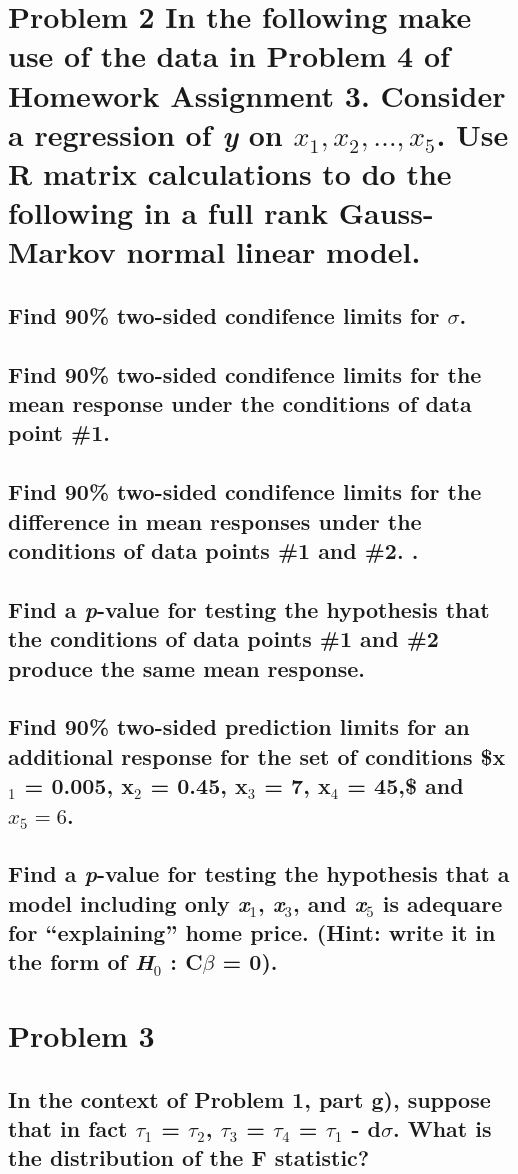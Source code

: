 \documentclass[11pt]{article}
\begin{document}
\section{Problem 2 In the following make use of the data in Problem 4 of Homework Assignment 3. Consider a regression of \emph{y} on $x_1, x_2,\ldots,x_5$. Use R matrix calculations to do the following in a full rank Gauss-Markov normal linear model.}
\label{sec-2}
\subsection{Find 90\% two-sided condifence limits for $\sigma$.}
\label{sec-2-1}
\subsection{Find 90\% two-sided condifence limits for the mean response under the conditions of data point \#1.}
\label{sec-2-2}
\subsection{Find 90\% two-sided condifence limits for the difference in mean responses under the conditions of data points \#1 and \#2. .}
\label{sec-2-3}
\subsection{Find a \emph{p}-value for testing the hypothesis that the conditions of data points \#1 and \#2 produce the same mean response.}
\label{sec-2-4}
\subsection{Find 90\% two-sided prediction limits for an additional response for the set of conditions \$x$_1$ = 0.005, x$_2$ = 0.45, x$_3$ = 7, x$_4$ = 45,\$ and $x_5 = 6$.}
\label{sec-2-5}
\subsection{Find a \emph{p}-value for testing the hypothesis that a model including only \emph{x$_1$}, \emph{x$_3$}, and \emph{x$_5$} is adequare for ``explaining'' home price. (Hint: write it in the form of \emph{H$_0$} : \textbf{C$\beta$ = 0}).}
\label{sec-2-6}
\section{Problem 3}
\label{sec-3}
\subsection{In the context of Problem 1, part g), suppose that in fact $\tau$$_1$ = $\tau$$_2$, $\tau$$_3$ = $\tau$$_4$ = $\tau$$_1$ - d$\sigma$. What is the distribution of the F statistic?}
\label{sec-3-1}
\end{document}
